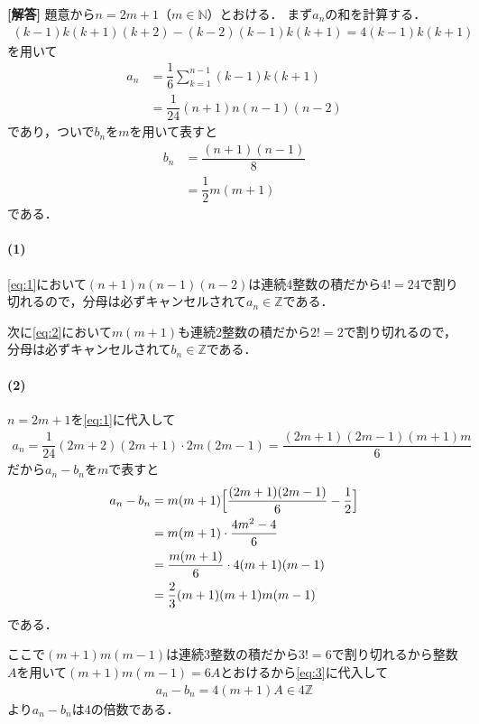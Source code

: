 \documentclass[../../main.tex]{subfiles}
\begin{document}
\begin{oframed}
  
\end{oframed}

{\bf [解答]}
題意から$n=2m+1$（$m\in\mathbb N$）とおける．
まず$a_n$の和を計算する．
\begin{align}
  (k-1)k(k+1)(k+2)-(k-2)(k-1)k(k+1)=4(k-1)k(k+1)
\end{align}
を用いて
\begin{align}
  a_n
  &=\dfrac{1}{6}\sum_{k=1}^{n-1}(k-1)k(k+1) \\
  &=\dfrac{1}{24}(n+1)n(n-1)(n-2) \label{eq:1}
\end{align}
であり，ついで$b_n$を$m$を用いて表すと
\begin{align}
  b_n
  &=\dfrac{(n+1)(n-1)}{8} \\
  &=\dfrac{1}{2}m(m+1) \label{eq:2}
\end{align}
である．

\paragraph{(1)}

\cref{eq:1}において$(n+1)n(n-1)(n-2)$は連続4整数の積だから$4!=24$で割り切れるので，分母は必ずキャンセルされて$a_n\in\mathbb Z$である．

次に\cref{eq:2}において$m(m+1)$も連続2整数の積だから$2!=2$で割り切れるので，分母は必ずキャンセルされて$b_n\in\mathbb Z$である．

\paragraph{(2)}

$n=2m+1$を\cref{eq:1}に代入して
\begin{align}
  a_n=\dfrac{1}{24}(2m+2)(2m+1)\cdot2m(2m-1)=\dfrac{(2m+1)(2m-1)(m+1)m}{6}
\end{align}
だから$a_n-b_n$を$m$で表すと
\begin{align}
  a_n-b_n
  &=m(m+1)\Bigl[\dfrac{(2m+1)(2m-1)}{6}-\dfrac{1}{2}\Bigr] \\
  &=m(m+1)\cdot\dfrac{4m^2-4}{6} \\
  &=\dfrac{m(m+1)}{6}\cdot4(m+1)(m-1)\\
  &=\dfrac{2}{3}(m+1)(m+1)m(m-1) \label{eq:3}
\end{align}
である．

ここで$(m+1)m(m-1)$は連続3整数の積だから$3!=6$で割り切れるから整数$A$を用いて$(m+1)m(m-1)=6A$とおけるから\cref{eq:3}に代入して
\begin{align}
  a_n-b_n=4(m+1)A \in4\mathbb Z
\end{align}
より$a_n-b_n$は$4$の倍数である．

\newpage
\end{document}
